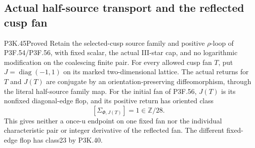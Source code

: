 \subsection{Actual half-source transport and the reflected cusp fan}
\begin{statement}{P3K.45}{Proved}
Retain the selected-cusp source family and positive \(\rho\)-loop
of P3F.54/P3F.56, with fixed scalar, the actual III-star cap, and no
logarithmic modification on the coalescing finite pair. For every
allowed cusp fan \(T\), put \(J=\operatorname{diag}(-1,1)\)
on its marked two-dimensional lattice. The actual returns for
\(T\) and \(J(T)\) are conjugate by an orientation-preserving
diffeomorphism, through the literal half-source family map.
For the initial fan of P3F.56, \(J(T)\) is its nonfixed
diagonal-edge flop, and its positive return has oriented class
\[
                 [\Sigma_{\Phi,J(T)}]=1\in\mathbb Z/28.
\]
This gives neither a once-u endpoint on one fixed fan nor the
individual characteristic pair or integer derivative of the
reflected fan. The different fixed-edge flop has class23 by
P3K.40.
\end{statement}
